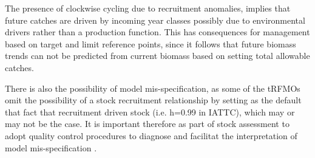 \documentclass[12pt,doublespacing,a4paper]{ouparticle}
\begin{document}



The presence of clockwise cycling due to recruitment anomalies, implies that future catches are driven by incoming year classes possibly due to environmental drivers rather than a production function. This has consequences for management based on target and limit reference points, since it follows that future biomass trends can not be predicted from current biomass based on setting total allowable catches.

There is also the possibility of model mis-specification, as some of the tRFMOs omit the possibility of a stock recruitment relationship by setting as the default that fact that recruitment driven stock (i.e. h=0.99 in IATTC), which may or may not be the case. It is important therefore as part of stock assessment to adopt quality control procedures to diagnose and 
 facilitat the interpretation of model mis-specification \citep{maunder2017dealing}.
\end{document}
